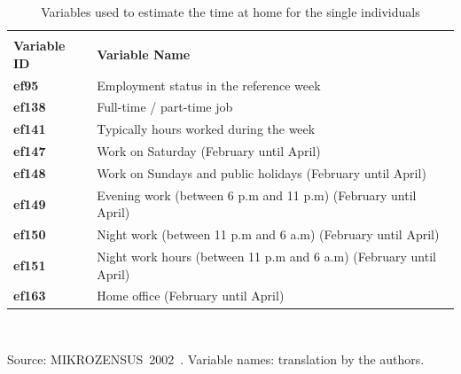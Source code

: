 \documentclass[11pt]{IJM-article}
\begin{document}
\begin{table}[htb] 
    \centering
    \caption{Variables used to estimate the time at home for the single 
    individuals} 
    \label{tab:4} 
    \begin{tabular}{l l}
        \addlinespace \toprule
        \multicolumn{2}{l}{\textbf{Labor participation}}\\ 
        \textbf{Variable ID} & \textbf{Variable Name} \\
        \textbf{ef95} & Employment status in the reference week\\ 
        \textbf{ef138} & Full-time / part-time job\\ 
        \textbf{ef141} & Typically hours worked during the week\\
        \textbf{ef147} & Work on Saturday (February until April)\\ 
        \textbf{ef148} & Work on Sundays and public holidays (February until 
            April)\\
        \textbf{ef149}& Evening work (between 6 p.m and 11 p.m) (February until
            April)\\ 
        \textbf{ef150} & Night work (between 11 p.m and 6 a.m) (February until 
            April)\\ 
        \textbf{ef151} & Night work hours (between 11 p.m and 6 a.m) (February
            until April)\\ 
        \textbf{ef163} & Home office (February until April)\\ \bottomrule 
    \end{tabular}\\ 
    \begin{flushright}
        \begin{footnotesize} Source:
            MIKROZENSUS~2002~\cite{StatistischesBundesamt.2002}. 
            Variable names: translation by the authors.\\ 
        \end{footnotesize} 
    \end{flushright}
\end{table}
\end{document}
